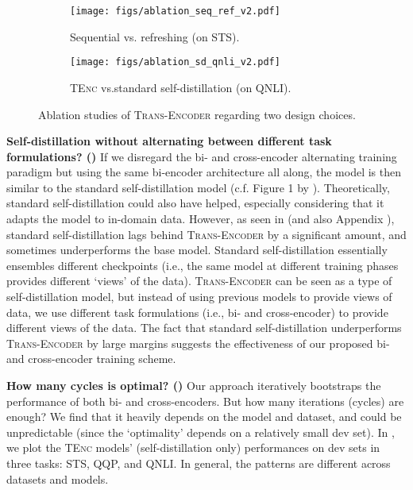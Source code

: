 \documentclass{article} \usepackage{iclr2021_conference,times}
\newcommand{\modelname}{\textsc{Trans-Encoder}\xspace}
\newcommand{\tenc}{\textsc{TEnc}\xspace}
\begin{document}
\begin{figure}
\begin{subfigure}{.5\textwidth}
  \centering
  \texttt{[image: figs/ablation\_seq\_ref\_v2.pdf]}
  \caption{Sequential vs. refreshing (on STS).}
  \label{fig:ablation_sfig1}
\end{subfigure}\begin{subfigure}{.5\textwidth}
  \centering
  \texttt{[image: figs/ablation\_sd\_qnli\_v2.pdf]}
  \caption{\tenc vs.standard self-distillation (on QNLI).}
  \label{fig:ablation_sfig2}
\end{subfigure}
\vspace{-0.5mm}
\caption{Ablation studies of \modelname regarding two design choices.}
\label{fig:ablation}
\vspace{-0.5mm}
\end{figure}


\textbf{Self-distillation without alternating between different task formulations? ()} If we disregard the bi- and cross-encoder alternating training paradigm but using the same bi-encoder architecture all along, the model is then similar to the standard self-distillation model (c.f. Figure 1 by \citet{mobahi2020self}). Theoretically, standard self-distillation could also have helped, especially considering that it adapts the model to in-domain data. However, as seen in  (and also Appendix ), standard self-distillation lags behind \modelname by a significant amount, and sometimes underperforms the base model. 
Standard self-distillation essentially ensembles different checkpoints (i.e., the same model at different training phases provides different `views' of the data). \modelname can be seen as a type of self-distillation model, but instead of using previous models to provide views of data, we use different task formulations (i.e., bi- and cross-encoder) to provide different views of the data. The fact that standard self-distillation underperforms \modelname by large margins suggests the effectiveness of our proposed bi- and cross-encoder training scheme. 



\textbf{How many cycles is optimal? ()} 
Our approach iteratively bootstraps the performance of both bi- and cross-encoders. 
But how many iterations (cycles) are enough? 
We find that it heavily depends on the model and dataset, and could be unpredictable (since the `optimality' depends on a relatively small dev set). 
In , we plot the \tenc models' (self-distillation only) performances on dev sets in three tasks: STS, QQP, and QNLI. 
In general, the patterns are different across datasets and models. 
\end{document}
